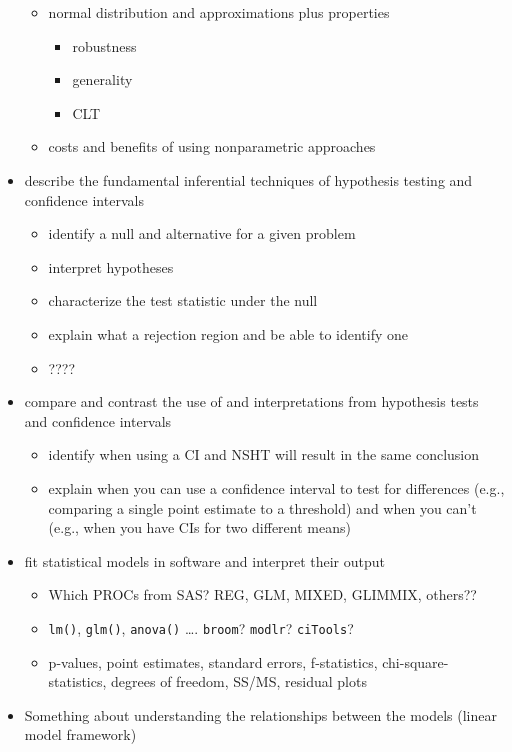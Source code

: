 \documentclass[]{book}
\providecommand{\tightlist}{%
  \setlength{\itemsep}{0pt}\setlength{\parskip}{0pt}}
\begin{document}
\begin{itemize}
  \begin{itemize}
  \tightlist
  \item
    normal distribution and approximations plus properties

    \begin{itemize}
    \tightlist
    \item
      robustness
    \item
      generality
    \item
      CLT
    \end{itemize}
  \item
    costs and benefits of using nonparametric approaches
  \end{itemize}
\item
  describe the fundamental inferential techniques of hypothesis testing and confidence intervals

  \begin{itemize}
  \tightlist
  \item
    identify a null and alternative for a given problem
  \item
    interpret hypotheses
  \item
    characterize the test statistic under the null
  \item
    explain what a rejection region and be able to identify one
  \item
    ????
  \end{itemize}
\item
  compare and contrast the use of and interpretations from hypothesis tests and confidence intervals

  \begin{itemize}
  \tightlist
  \item
    identify when using a CI and NSHT will result in the same conclusion
  \item
    explain when you can use a confidence interval to test for differences (e.g., comparing a single point estimate to a threshold) and when you can't (e.g., when you have CIs for two different means)
  \end{itemize}
\item
  fit statistical models in software and interpret their output

  \begin{itemize}
  \tightlist
  \item
    Which PROCs from SAS? REG, GLM, MIXED, GLIMMIX, others??
  \item
    \texttt{lm()}, \texttt{glm()}, \texttt{anova()} \ldots{}. \texttt{broom}? \texttt{modlr}? \texttt{ciTools}?
  \item
    p-values, point estimates, standard errors, f-statistics, chi-square-statistics, degrees of freedom, SS/MS, residual plots
  \end{itemize}
\item
  Something about understanding the relationships between the models (linear model framework)


\end{itemize}
\end{document}
